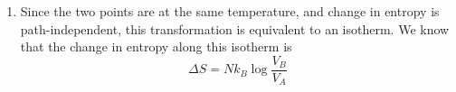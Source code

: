\documentclass[11pt]{article}
\begin{document}
\begin{enumerate}
    \item Since the two points are at the same temperature, and change in entropy is path-independent, this transformation is equivalent to an isotherm. We know that the change in entropy along this isotherm is
    \begin{equation*}
      \Delta S = N k_B \log \frac{V_B}{V_A}
    \end{equation*}
  \end{enumerate}
\end{document}
